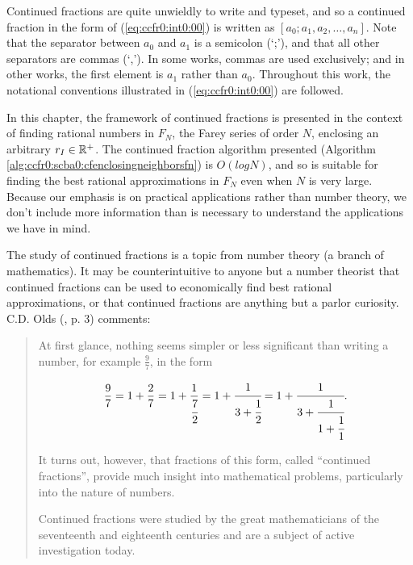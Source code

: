 Continued fractions are quite unwieldly to write and typeset,
and so a continued fraction in the form of (\ref{eq:ccfr0:int0:00})
is written as $[a_0; a_1, a_2, \ldots , a_n]$.  Note that the
separator between $a_0$ and $a_1$ is a semicolon (`;'), and that all other
separators are commas (`,').  In some works, commas are used exclusively; and in
other works, the first element is $a_1$ rather than $a_0$.  Throughout this
work, the notational conventions illustrated in (\ref{eq:ccfr0:int0:00}) are
followed.

In this chapter, the framework of continued fractions is presented in the
context of finding rational numbers in $F_N$, the Farey series of order $N$,
enclosing an arbitrary $r_I \in {\mathbb{R}^+}$.  The continued fraction
algorithm presented (Algorithm \ref{alg:ccfr0:scba0:cfenclosingneighborsfn})
is $O(log N)$, and so is suitable for finding the best rational
approximations in $F_N$ even when $N$ is very large.  Because our emphasis 
is on practical applications rather than number theory, we don't include more
information than is necessary to understand the applications we have in 
mind.

The study of continued
fractions is a topic from number theory (a branch of mathematics).  It may be
counterintuitive to anyone but a number theorist that continued fractions
can be used to economically find best rational approximations, 
or that continued fractions are anything but
a parlor curiosity.  C.D. Olds (\cite{bibref:b:OldsClassic}, p. 3) comments:


\begin{quote}
At first glance, nothing seems simpler or less significant than writing a number,
for example $\frac{9}{7}$, in the form

\begin{equation}
\frac{9}{7} = 1 + \frac{2}{7} = 1 + \frac{1}{\cfrac{7}{2}}
            = 1 + \cfrac{1}{3 + \cfrac{1}{2}}
            = 1 + \cfrac{1}{3 + \cfrac{1}{1 + \cfrac{1}{1}}}.
\end{equation}

It turns out, however, that fractions of this form, called ``continued
fractions'', provide much insight into mathematical problems, particularly into
the nature of numbers.

Continued fractions were studied by the great mathematicians of the seventeenth
and eighteenth centuries and are a subject of active investigation today.
\end{quote}


